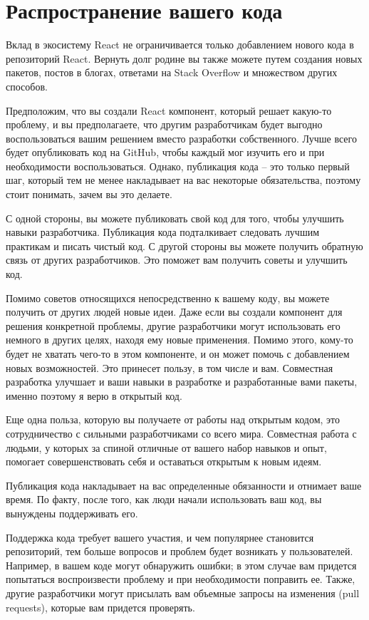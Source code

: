 \section{Распространение вашего кода}

Вклад в экосистему React не ограничивается только добавлением нового кода в репозиторий React. Вернуть долг родине вы также можете путем создания новых пакетов, постов в блогах, ответами на Stack Overflow и множеством других способов.

Предположим, что вы создали React компонент, который решает какую-то проблему, и вы предполагаете, что другим разработчикам будет выгодно воспользоваться вашим решением вместо разработки собственного. Лучше всего будет опубликовать код на GitHub, чтобы каждый мог изучить его и при необходимости воспользоваться. Однако, публикация кода -- это только первый шаг, который тем не менее накладывает на вас некоторые обязательства, поэтому стоит понимать, зачем вы это делаете. 

С одной стороны, вы можете публиковать свой код для того, чтобы улучшить навыки разработчика. Публикация кода подталкивает следовать лучшим практикам и писать чистый код. С другой стороны вы можете получить обратную связь от других разработчиков. Это поможет вам получить советы и улучшить код.

Помимо советов относящихся непосредственно к вашему коду, вы можете получить от других людей новые идеи. Даже если вы создали компонент для решения конкретной проблемы, другие разработчики могут использовать его немного в других целях, находя ему новые применения. Помимо этого, кому-то будет не хватать чего-то в этом компоненте, и он может помочь с добавлением новых возможностей. Это принесет пользу, в том числе и вам. Совместная разработка улучшает и ваши навыки в разработке и разработанные вами пакеты, именно поэтому я верю в открытый код.

Еще одна польза, которую вы получаете от работы над открытым кодом, это сотрудничество с сильными разработчиками со всего мира. Совместная работа с людьми, у которых за спиной отличные от вашего набор навыков и опыт, помогает совершенствовать себя и оставаться открытым к новым идеям.

Публикация кода накладывает на вас определенные обязанности и отнимает ваше время. По факту, после того, как люди начали использовать ваш код, вы вынуждены поддерживать его. 

Поддержка кода требует вашего участия, и чем популярнее становится репозиторий, тем больше вопросов и проблем будет возникать у пользователей. Например, в вашем коде могут обнаружить ошибки; в этом случае вам придется попытаться воспроизвести проблему и при необходимости поправить ее. Также, другие разработчики могут присылать вам объемные запросы на изменения (pull requests), которые вам придется проверять. 

